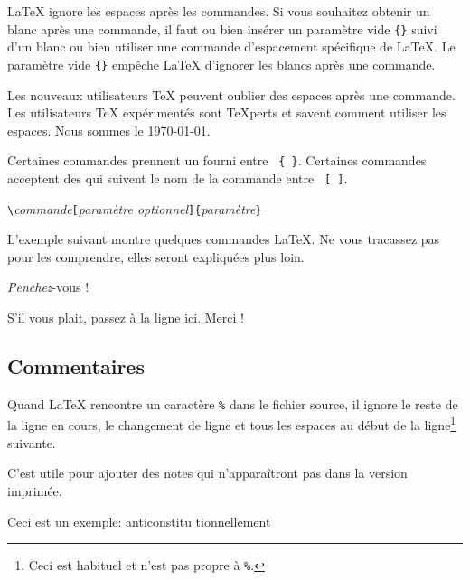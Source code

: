 %
%
\label{whitespace}
\LaTeX{} ignore les espaces après les commandes. Si vous souhaitez
obtenir un blanc après une commande,
il faut ou bien insérer un paramètre vide \verb|{}| suivi d'un blanc
ou bien utiliser une commande d'espacement spécifique de \LaTeX{}. Le
paramètre vide \verb|{}| empêche \LaTeX{} d'ignorer les blancs après une
commande.

\begin{example}
Les nouveaux utilisateurs \TeX
peuvent oublier des espaces après
une commande. %
Les utilisateurs \TeX{}
expérimentés sont \TeX perts et
savent comment utiliser les
espaces. %
Nous sommes le \today.
\end{example}

Certaines commandes prennent un  fourni entre
~\verb|{ }|. Certaines commandes acceptent des
 qui suivent le nom de la commande entre
~\verb|[ ]|.
\begin{code}
\verb|\|\textit{commande}\verb|[|\textit{paramètre optionnel}\verb|]{|\textit{paramètre}\verb|}|
\end{code}
L'exemple suivant montre quelques commandes \LaTeX{}. Ne vous
tracassez pas pour les comprendre, elles seront expliquées plus loin.

\begin{example}
\textsl{Penchez}-vous !
\end{example}
\begin{example}
S'il vous plait, passez \`a la
ligne ici.\newline
Merci !
\end{example}

\subsection{Commentaires}

Quand \LaTeX{} rencontre un caractère \verb|%| dans le fichier
source, il ignore le reste de la ligne en cours, le changement de ligne
et tous les espaces au début de la ligne\footnote{Ceci est habituel et n'est pas propre à \texttt{\%}.
  \NdT}  suivante.

C'est utile pour ajouter des notes qui n'apparaîtront pas dans la
version imprimée.

\begin{example}
Ceci est un %
exemple: anticonstitu%
       tionnellement
\end{example}

